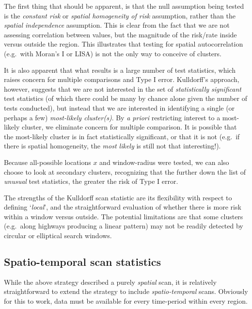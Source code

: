 \documentclass[
]{book}
\begin{document}
The first thing that should be apparent, is that the null assumption being tested is the \emph{constant risk} or \emph{spatial homogeneity of risk} assumption, rather than the \emph{spatial independence} assumption. This is clear from the fact that we are not assessing correlation between values, but the magnitude of the risk/rate inside versus outside the region. This illustrates that testing for spatial autocorrelation (e.g.~with Moran's I or LISA) is not the only way to conceive of clusters.

It is also apparent that what results is a large number of test statistics, which raises concern for multiple comparisons and Type I error. Kulldorff's approach, however, suggests that we are not interested in the set of \emph{statistically significant} test statistics (of which there could be many by chance alone given the number of tests conducted), but instead that we are interested in identifying a single (or perhaps a few) \emph{most-likely cluster(s)}. By \emph{a priori} restricting interest to a most-likely cluster, we eliminate concern for multiple comparison. It is possible that the most-likely cluster is in fact statistically significant, or that it is not (e.g.~if there is spatial homogeneity, the \emph{most likely} is still not that interesting!).

Because all-possible locations \(x\) and window-radius were tested, we can also choose to look at secondary clusters, recognizing that the further down the list of \emph{unusual} test statistics, the greater the risk of Type I error.

The strengths of the Kulldorff scan statistic are its flexibility with respect to defining `\emph{local}', and the straightforward evaluation of whether there is more risk within a window versus outside. The potential limitations are that some clusters (e.g.~along highways producing a linear pattern) may not be readily detected by circular or elliptical search windows.

\hypertarget{spatio-temporal-scan-statistics}{%
\subsection{Spatio-temporal scan statistics}\label{spatio-temporal-scan-statistics}}

While the above strategy described a purely \emph{spatial} scan, it is relatively straightforward to extend the strategy to include \emph{spatio-temporal} scans. Obviously for this to work, data must be available for every time-period within every region.
\end{document}
